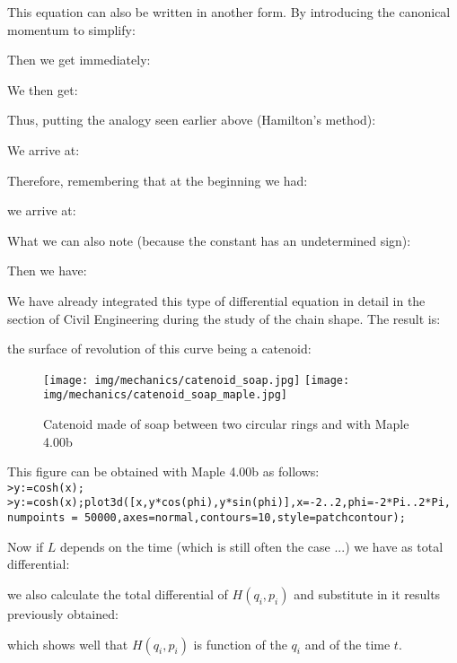 	\begin{tcolorbox}[colframe=black,colback=white,sharp corners]
	This equation can also be written in another form. By introducing the canonical momentum to simplify:
	
	Then we get immediately:
	
	We then get:
	
	Thus, putting the analogy seen earlier above (Hamilton's method):
	
	We arrive at:
	
	Therefore, remembering that at the beginning we had:
	
	we arrive at:
	
	What we can also note (because the constant has an undetermined sign):
	
	Then we have:
	
	We have already integrated this type of differential equation in detail in the section of Civil Engineering during the study of the chain shape. The result is:
	
	the surface of revolution of this curve being a catenoid:
	\end{tcolorbox}
	
	\begin{tcolorbox}[colframe=black,colback=white,sharp corners]
	\begin{figure}[H]
		\centering
		\texttt{[image: img/mechanics/catenoid\_soap.jpg]}
		\texttt{[image: img/mechanics/catenoid\_soap\_maple.jpg]}
		\caption[]{Catenoid made of soap between two circular rings and with Maple 4.00b}
	\end{figure}
	This figure can be obtained with Maple 4.00b as follows:\\
	
	\texttt{>y:=cosh(x);}\\
	\texttt{>y:=cosh(x);plot3d([x,y*cos(phi),y*sin(phi)],x=-2..2,phi=-2*Pi..2*Pi,}\\
	\texttt{numpoints = 50000,axes=normal,contours=10,style=patchcontour);}\\
	\end{tcolorbox}
	Now if $L$ depends on the time (which is still often the case ...) we have as total differential:
	
	we also calculate the total differential of $H(q_i,p_i)$ and substitute in it results previously obtained:
	
	which shows well that $H(q_i,p_i)$ is function of the $q_i$ and of the time $t$.

